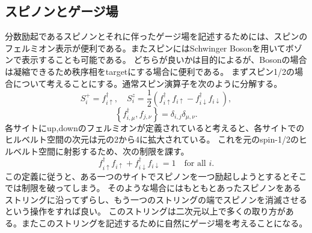 \documentclass[11pt, aps, longbibliography]{article}
\begin{document}
    \subsection{スピノンとゲージ場}
        分数励起であるスピノンとそれに伴ったゲージ場を記述するためには、スピンのフェルミオン表示が便利である。またスピンにはSchwinger Bosonを用いてボゾンで表示することも可能である。
        どちらが良いかは目的によるが、Bosonの場合は凝縮できるため秩序相をtargetにする場合に便利である。
        まずスピン1/2の場合について考えることにする。通常スピン演算子を次のように分解する。
        \begin{equation}\label{eq:2-1}
            S_i^+ = f_{i\uparrow}^\dagger, \quad S_i^z = \frac{1}{2}(f_{i\uparrow}^\dagger f_{i\uparrow} - f_{i\downarrow}^\dagger f_{i\downarrow}),
        \end{equation}
        \begin{equation}\label{eq:2-2}
            \left\{ f_{i,\mu}^\dagger, f_{j,\nu} \right\} = \delta_{i,j}\delta_{\mu,\nu}.
        \end{equation}
        各サイトにup,downのフェルミオンが定義されていると考えると、各サイトでのヒルベルト空間の次元は元の2から4に拡大されている。
        これを元のspin-1/2のヒルベルト空間に射影するため、次の制限を課す。
        \begin{equation}\label{eq:2-3}
            f_{i\uparrow}^\dagger f_{i\uparrow} + f_{i\downarrow}^\dagger f_{i\downarrow} = 1 \quad \text{for all } i.
        \end{equation}
        この定義に従うと、ある一つのサイトでスピノンを一つ励起しようとするとそこでは制限を破ってしまう。
        そのような場合にはもともとあったスピノンをあるストリングに沿ってずらし、もう一つのストリングの端でスピノンを消滅させるという操作をすれば良い。
        このストリングは二次元以上で多くの取り方がある。またこのストリングを記述するために自然にゲージ場を考えることになる。
\end{document}

